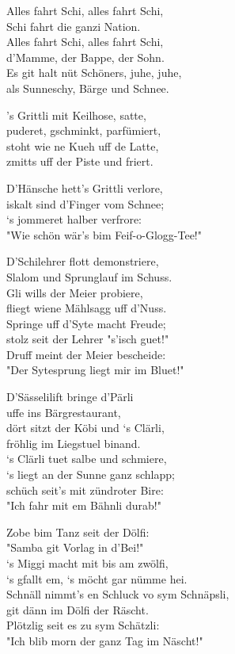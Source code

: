 \documentclass[
  letterpaper,
  twoside=false]{scrbook}
\begin{document}
Alles fahrt Schi, alles fahrt Schi,\\
Schi fahrt die ganzi Nation.\\
Alles fahrt Schi, alles fahrt Schi,\\
d'Mamme, der Bappe, der Sohn.\\
Es git halt nüt Schöners, juhe, juhe,\\
als Sunneschy, Bärge und Schnee.

's Grittli mit Keilhose, satte,\\
puderet, gschminkt, parfümiert,\\
stoht wie ne Kueh uff de Latte,\\
zmitts uff der Piste und friert.

D'Hänsche hett's Grittli verlore,\\
iskalt sind d'Finger vom Schnee;\\
`s jommeret halber verfrore:\\
"Wie schön wär's bim Feif-o-Glogg-Tee!"

D'Schilehrer flott demonstriere,\\
Slalom und Sprunglauf im Schuss.\\
Gli wills der Meier probiere,\\
fliegt wiene Mählsagg uff d'Nuss.\\
Springe uff d'Syte macht Freude;\\
stolz seit der Lehrer "s'isch guet!"\\
Druff meint der Meier bescheide:\\
"Der Sytesprung liegt mir im Bluet!"

D'Sässelilift bringe d'Pärli\\
uffe ins Bärgrestaurant,\\
dört sitzt der Köbi und `s Clärli,\\
fröhlig im Liegstuel binand.\\
`s Clärli tuet salbe und schmiere,\\
`s liegt an der Sunne ganz schlapp;\\
schüch seit's mit zündroter Bire:\\
"Ich fahr mit em Bähnli durab!"

Zobe bim Tanz seit der Dölfi:\\
"Samba git Vorlag in d'Bei!"\\
`s Miggi macht mit bis am zwölfi,\\
`s gfallt em, `s möcht gar nümme hei.\\
Schnäll nimmt's en Schluck vo sym Schnäpsli,\\
git dänn im Dölfi der Räscht.\\
Plötzlig seit es zu sym Schätzli:\\
"Ich blib morn der ganz Tag im Näscht!"
\end{document}
